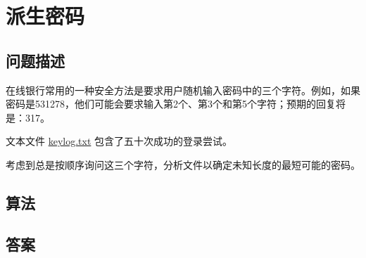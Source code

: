 \section{派生密码}\label{sec:problem79}
\subsection{问题描述}
\begin{tcolorbox}
在线银行常用的一种安全方法是要求用户随机输入密码中的三个字符。例如，如果密码是531278，他们可能会要求输入第2个、第3个和第5个字符；预期的回复将是：317。

文本文件 \href{https://projecteuler.net/resources/documents/0079_keylog.txt}{keylog.txt} 包含了五十次成功的登录尝试。

考虑到总是按顺序询问这三个字符，分析文件以确定未知长度的最短可能的密码。

\end{tcolorbox}

\subsection{算法}


\subsection{答案}
